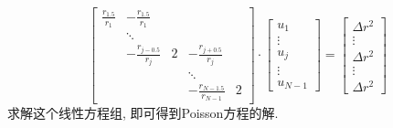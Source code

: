 \documentclass[a4paper,zihao=5,UTF8]{ctexart}
\begin{document}
	\begin{equation}
		\begin{bmatrix}
			\frac{r_{1.5}}{r_1} & -\frac{r_{1.5}}{r_1} & & & \\
			 & \ddots & & & \\
			 & -\frac{r_{j - 0.5}}{r_j} & 2 & -\frac{r_{j + 0.5}}{r_j} & \\
			 & & & \ddots & \\
			 & & & -\frac{r_{N - 1.5}}{r_{N-1}} & 2
		\end{bmatrix}
		\cdot
		\begin{bmatrix}
			u_1 \\
			\vdots\\
			u_j\\
			\vdots\\
			u_{N-1}
		\end{bmatrix}
		=
		\begin{bmatrix}
			\Delta r^2\\
			\vdots \\
			\Delta r^2 \\
			\vdots \\
			\Delta r^2
		\end{bmatrix}
	\end{equation}
	求解这个线性方程组, 即可得到Poisson方程的解.
	
\end{document}
